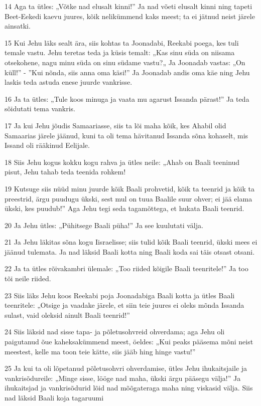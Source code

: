 \par 14 Aga ta ütles: „Võtke nad elusalt kinni!” Ja nad võeti elusalt kinni ning tapeti Beet-Eekedi kaevu juures, kõik nelikümmend kaks meest; ta ei jätnud neist järele ainsatki.
\par 15 Kui Jehu läks sealt ära, siis kohtas ta Joonadabi, Reekabi poega, kes tuli temale vastu. Jehu teretas teda ja küsis temalt: „Kas sinu süda on niisama otsekohene, nagu minu süda on sinu südame vastu?„ Ja Joonadab vastas: „On küll!” - ”Kui nõnda, siis anna oma käsi!” Ja Joonadab andis oma käe ning Jehu laskis teda astuda enese juurde vankrisse.
\par 16 Ja ta ütles: „Tule koos minuga ja vaata mu agarust Issanda pärast!” Ja teda sõidutati tema vankris.
\par 17 Ja kui Jehu jõudis Samaariasse, siis ta lõi maha kõik, kes Ahabil olid Samaarias järele jäänud, kuni ta oli tema hävitanud Issanda sõna kohaselt, mis Issand oli rääkinud Eelijale.
\par 18 Siis Jehu kogus kokku kogu rahva ja ütles neile: „Ahab on Baali teeninud pisut, Jehu tahab teda teenida rohkem!
\par 19 Kutsuge siis nüüd minu juurde kõik Baali prohvetid, kõik ta teenrid ja kõik ta preestrid, ärgu puudugu ükski, sest mul on tuua Baalile suur ohver; ei jää elama ükski, kes puudub!” Aga Jehu tegi seda tagamõttega, et hukata Baali teenrid.
\par 20 Ja Jehu ütles: „Pühitsege Baali püha!” Ja see kuulutati välja.
\par 21 Ja Jehu läkitas sõna kogu Iisraelisse; siis tulid kõik Baali teenrid, ükski mees ei jäänud tulemata. Ja nad läksid Baali kotta ning Baali koda sai täis otsast otsani.
\par 22 Ja ta ütles rõivakambri ülemale: „Too riided kõigile Baali teenritele!” Ja too tõi neile riided.
\par 23 Siis läks Jehu koos Reekabi poja Joonadabiga Baali kotta ja ütles Baali teenritele: „Otsige ja vaadake järele, et siin teie juures ei oleks mõnda Issanda sulast, vaid oleksid ainult Baali teenrid!”
\par 24 Siis läksid nad sisse tapa- ja põletusohvreid ohverdama; aga Jehu oli paigutanud õue kaheksakümmend meest, öeldes: „Kui peaks pääsema mõni neist meestest, kelle ma toon teie kätte, siis jääb hing hinge vastu!”
\par 25 Ja kui ta oli lõpetanud põletusohvri ohverdamise, ütles Jehu ihukaitsjaile ja vankrisõdureile: „Minge sisse, lööge nad maha, ükski ärgu pääsegu välja!” Ja ihukaitsjad ja vankrisõdurid lõid nad mõõgateraga maha ning viskasid välja. Siis nad läksid Baali koja tagaruumi
